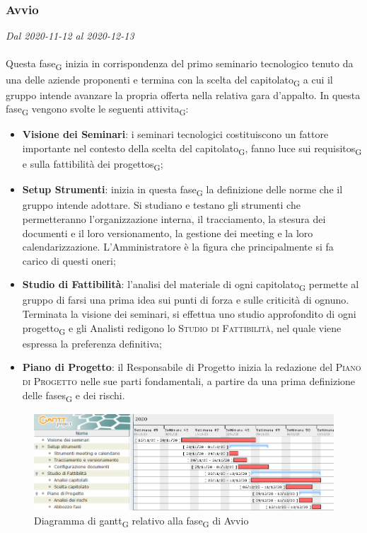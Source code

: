 \subsubsection{Avvio}

\textit{Dal 2020-11-12 al 2020-12-13}
\\\\
Questa \gls{fase}\textsubscript{G} inizia in corrispondenza del primo seminario tecnologico tenuto da una delle aziende proponenti e termina con la scelta del \gls{capitolato}\textsubscript{G} a cui il gruppo intende avanzare la propria offerta nella relativa gara d'appalto.
In questa \gls{fase}\textsubscript{G} vengono svolte le seguenti \gls{attivita}\textsubscript{G}:
\begin{itemize}
	\item \textbf{Visione dei Seminari}: i seminari tecnologici costituiscono un fattore importante nel contesto della scelta del \gls{capitolato}\textsubscript{G}, fanno luce sui \glspl{requisito}\textsubscript{G} e sulla fattibilità dei \glspl{progetto}\textsubscript{G};
	\item \textbf{Setup Strumenti}: inizia in questa \gls{fase}\textsubscript{G} la definizione delle norme che il gruppo intende adottare. Si studiano e testano gli strumenti che permetteranno l'organizzazione interna, il tracciamento, la stesura dei documenti e il loro versionamento, la gestione dei meeting e la loro calendarizzazione. L'Amministratore è la figura che principalmente si fa carico di questi oneri;
	\item \textbf{Studio di Fattibilità}: l'analisi del materiale di ogni \gls{capitolato}\textsubscript{G} permette al gruppo di farsi una prima idea sui punti di forza e sulle criticità di ognuno. Terminata la visione dei seminari, si effettua uno studio approfondito di ogni \gls{progetto}\textsubscript{G} e gli Analisti redigono lo \textsc{Studio di Fattibilità}, nel quale viene espressa la preferenza definitiva;
	\item \textbf{Piano di Progetto}: il Responsabile di Progetto inizia la redazione del \textsc{Piano di Progetto} nelle sue parti fondamentali, a partire da una prima definizione delle \glspl{fase}\textsubscript{G} e dei rischi.
\end{itemize}  


\begin{figure}[H]
	\centering
	\includegraphics[scale=0.62]{res/images/01_gantt_avvio.png}
	\caption{Diagramma di \gls{gantt}\textsubscript{G} relativo alla \gls{fase}\textsubscript{G} di Avvio}
\end{figure}




